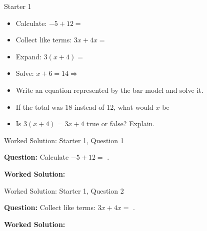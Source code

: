 \documentclass{beamer}
\newcommand{\ablank}[1]{%
  \alt<2>{\textcolor{red}{#1}}{\underline{\phantom{#1}}}%
}
\newcommand{\ashow}[1]{\uncover<2->{\textcolor{red}{\small #1}}}
\newcommand{\ashowq}[1]{\alt<2->{\textcolor{red}{\small #1}}{?}}
\begin{document}
\begin{frame}{Starter 1}
\hypertarget{q-st1}{}

\begin{itemize}
  \item Calculate: $-5 + 12 =$ \ablank{$7$}
  \item Collect like terms: $3x + 4x =$ \ablank{$7x$}
  \item Expand: $3(x + 4) =$ \ablank{$3x+12$}
  \item Solve: $x + 6 = 14 \Rightarrow$ \ablank{$x=8$}
\end{itemize}

\vspace{0.3cm}

\begin{center}
\end{center}

\begin{itemize}
  \item Write an equation represented by the bar model and solve it. \ashow{$2x+4=12$, so $x=4$.}
  \item If the total was 18 instead of 12, what would $x$ be\ashowq{~$x=7$.}
  \item Is $3(x+4)=3x+4$ true or false? Explain. \ashow{False, because $3(x+4)=3x+12$.}
\end{itemize}

\end{frame}

\begin{frame}{Worked Solution: Starter 1, Question 1}
\hypertarget{work-st1}{}

\textbf{Question:} Calculate $-5+12=$\ablank{$7$}.

\textbf{Worked Solution:} \ashow{Start at $-5$ and move $12$ units to the right, landing on $7$.}

\end{frame}

\begin{frame}{Worked Solution: Starter 1, Question 2}

\textbf{Question:} Collect like terms: $3x+4x=$\ablank{$7x$}.

\textbf{Worked Solution:} \ashow{Add the coefficients: $3+4=7$, so $3x+4x=7x$.}

\end{frame}
\end{document}
